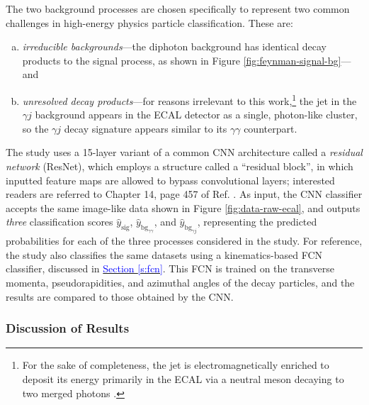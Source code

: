 \documentclass[11pt, a4paper]{article}
\newcommand{\myhref}[2]{\hyperref[#1]{\textcolor{blue}{#2}}}
\begin{document}
The two background processes are chosen specifically to represent two common challenges in high-energy physics particle classification.
These are:
\begin{enumerate}[(a)]

    \item \textit{irreducible backgrounds}---the diphoton background has identical decay products to the signal process, as shown in Figure \ref{fig:feynman-signal-bg}---and %

    \item \textit{unresolved decay products}---for reasons irrelevant to this work,\footnote{For the sake of completeness, the jet is electromagnetically enriched to deposit its energy primarily in the ECAL via a neutral meson decaying to two merged photons \cite{andrews-higgs, data-bg-jet}.} the jet in the $ \gamma j $ background appears in the ECAL detector as a single, photon-like cluster, so the $ \gamma j $ decay signature appears similar to its $ \gamma \gamma $ counterpart.

\end{enumerate}
The study uses a 15-layer variant of a common CNN architecture called a \textit{residual network} (ResNet), which employs a structure called a ``residual block'', in which inputted feature maps are allowed to bypass convolutional layers; interested readers are referred to Chapter 14, page 457 of Ref. \cite{homl}.
As input, the CNN classifier accepts the same image-like data shown in Figure \ref{fig:data-raw-ecal}, and outputs \textit{three} classification scores $ \hat{y}_{\text{sig}} $, $ \hat{y}_{\text{bg}_{\gamma\gamma}} $, and $ \hat{y}_{\text{bg}_{\gamma j}} $, representing the predicted probabilities for each of the three processes considered in the study.
For reference, the study also classifies the same datasets using a kinematics-based FCN classifier, discussed in \myhref{s:fcn}{Section \ref{s:fcn}}.
This FCN is trained on the transverse momenta, pseudorapidities, and azimuthal angles of the decay particles, and the results are compared to those obtained by the CNN.

\subsubsection{Discussion of Results}
\end{document}
